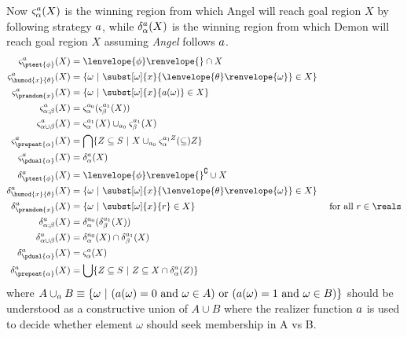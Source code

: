 \documentclass[12pt]{cmuthesis}
\theoremstyle{definition}
\theoremstyle{remark}
\newcommand{\om}{\omega}
\newcommand{\tint}[2]{\lenvelope{#1}\renvelope{#2}}
\newcommand{\fint}[1]{\lenvelope{#1}\renvelope}
\begin{document}
Now $\strategyforR[\alpha]{\aa}{X}$ is the winning region from which Angel will reach goal region $X$ by following strategy $\aa$, while 
$\dstrategyforR[\alpha]{\aa}{X}$ is the winning region from which Demon will reach goal region $X$ assuming \emph{Angel} follows $\aa$.
\begin{align*}
\strategyforR[\ptest{\phi}]{\aa}{X}           &= \fint{\phi}{} \cap X &&\text{}\\ 
\strategyforR[\humod{x}{\theta}]{\aa}{X} &=  \{\om~|~\subst[\om]{x}{\tint{\theta}{\om}} \in X\}&&\text{}\\ 
\strategyforR[\prandom{x}]{\aa}{X}         &=  \{\om~|~\subst[\om]{x}{\aa(\om)} \in X\}&&\text{}\\ 
\strategyforR[\alpha;\beta]{\aa}{X}          &= \strategyforR[\alpha]{\rzFst{\aa}}{\strategyforR[\beta]{\rzSnd{\aa}}{X}} &&\text{}\\ 
\strategyforR[\alpha\cup\beta]{\aa}{X}     &= \strategyforR[\alpha]{\rzSnd{\aa}}{X} \cup_{\rzFst{\aa}} \strategyforR[\beta]{\rzSnd{\aa}}{X}&&\text{}\\ 
\strategyforR[\prepeat{\alpha}]{\aa}{X}   &=  \bigcap\{Z\subseteq S~|~X \cup_{\rzFst{\aa}} \strategyforR[\alpha]{\rzSnd{\aa}Z} \subseteq Z\}&&\text{}\\ 
\strategyforR[\pdual{\alpha}]{\aa}{X}      &=  \dstrategyforR[\alpha]{\aa}{X}&&\text{}\\ 
\dstrategyforR[\ptest{\phi}]{\aa}{X}           &= \fint{\phi}{}^\complement \cup X &&\text{}\\ 
\dstrategyforR[\humod{x}{\theta}]{\aa}{X} &= \{\om~|~\subst[\om]{x}{\tint{\theta}{\om}} \in X\} &&\text{}\\ 
\dstrategyforR[\prandom{x}]{\aa}{X}         &= \{\om~|~\subst[\om]{x}{r} \in X\}&&\text{ for all }r \in \reals\\ 
\dstrategyforR[\alpha;\beta]{\aa}{X}          &= \dstrategyforR[\alpha]{\rzFst{\aa}}{\dstrategyforR[\beta]{\rzSnd{\aa}}{X}} &&\text{}\\ 
\dstrategyforR[\alpha\cup\beta]{\aa}{X}     &= \dstrategyforR[\alpha]{\rzFst{\aa}}{X} \cap \dstrategyforR[\beta]{\rzSnd{\aa}}{X}&&\text{}\\ 
\dstrategyforR[\pdual{\alpha}]{\aa}{X}      &= \strategyforR[\alpha]{\aa}{X}&&\text{}\\ 
\dstrategyforR[\prepeat{\alpha}]{\aa}{X}   &= \bigcup\{Z\subseteq S~|~Z \subseteq X \cap \dstrategyforR[\alpha]{\aa}{Z}\}&&\text{}
\end{align*}
where $A \cup_\aa B \equiv \{\om~|~ (\aa(\om)=0\text{ and } \om \in A) \text{ or }(\aa(\om)=1\text{ and } \om \in B)\}$ should be understood as a constructive union of $A \cup B$ where the realizer function $\aa$ is used to decide whether element $\om$ should seek membership in A vs B.
\end{document}
